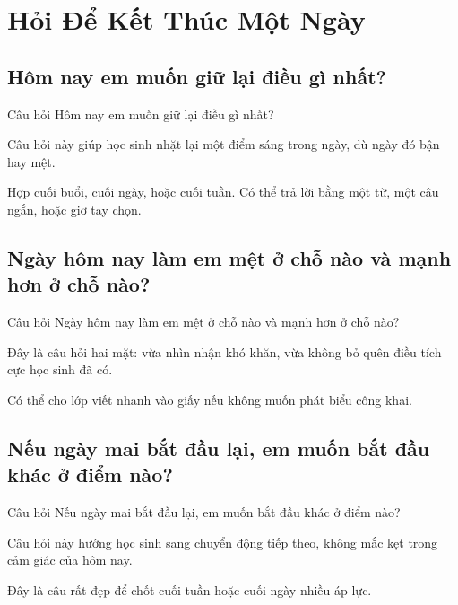 \chapter{Hỏi Để Kết Thúc Một Ngày}

\section{Hôm nay em muốn giữ lại điều gì nhất?}
\begin{cauhoibox}{Câu hỏi}
Hôm nay em muốn giữ lại điều gì nhất?
\end{cauhoibox}
\begin{taisaocoich}
Câu hỏi này giúp học sinh nhặt lại một điểm sáng trong ngày, dù ngày đó bận hay mệt.
\end{taisaocoich}
\begin{goiybien}
Hợp cuối buổi, cuối ngày, hoặc cuối tuần. Có thể trả lời bằng một từ, một câu ngắn, hoặc giơ tay chọn.
\end{goiybien}
\ngancach

\section{Ngày hôm nay làm em mệt ở chỗ nào và mạnh hơn ở chỗ nào?}
\begin{cauhoibox}{Câu hỏi}
Ngày hôm nay làm em mệt ở chỗ nào và mạnh hơn ở chỗ nào?
\end{cauhoibox}
\begin{taisaocoich}
Đây là câu hỏi hai mặt: vừa nhìn nhận khó khăn, vừa không bỏ quên điều tích cực học sinh đã có.
\end{taisaocoich}
\begin{goiybien}
Có thể cho lớp viết nhanh vào giấy nếu không muốn phát biểu công khai.
\end{goiybien}
\ngancach

\section{Nếu ngày mai bắt đầu lại, em muốn bắt đầu khác ở điểm nào?}
\begin{cauhoibox}{Câu hỏi}
Nếu ngày mai bắt đầu lại, em muốn bắt đầu khác ở điểm nào?
\end{cauhoibox}
\begin{taisaocoich}
Câu hỏi này hướng học sinh sang chuyển động tiếp theo, không mắc kẹt trong cảm giác của hôm nay.
\end{taisaocoich}
\begin{goiybien}
Đây là câu rất đẹp để chốt cuối tuần hoặc cuối ngày nhiều áp lực.
\end{goiybien}
\ngancach

